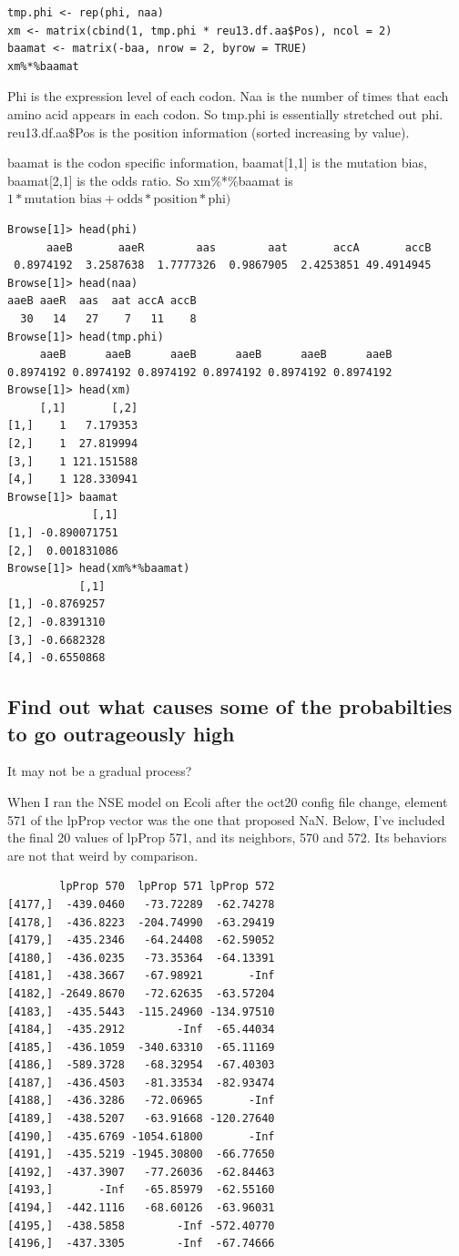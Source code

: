 \begin{verbatim}
tmp.phi <- rep(phi, naa)
xm <- matrix(cbind(1, tmp.phi * reu13.df.aa$Pos), ncol = 2)
baamat <- matrix(-baa, nrow = 2, byrow = TRUE)
xm%*%baamat
\end{verbatim}

Phi is the expression level of each codon. Naa is the number of times that each amino acid appears in each codon. So tmp.phi is essentially stretched out phi. reu13.df.aa\$Pos is the position information (sorted increasing by value). 

baamat is the codon specific information, baamat[1,1] is the mutation bias, baamat[2,1] is the odds ratio. So xm\%*\%baamat is $1*\mbox{mutation bias}+\mbox{odds}*\mbox{position}*\mbox{phi})$

\begin{verbatim}
Browse[1]> head(phi)
      aaeB       aaeR        aas        aat       accA       accB 
 0.8974192  3.2587638  1.7777326  0.9867905  2.4253851 49.4914945 
Browse[1]> head(naa)
aaeB aaeR  aas  aat accA accB 
  30   14   27    7   11    8 
Browse[1]> head(tmp.phi)
     aaeB      aaeB      aaeB      aaeB      aaeB      aaeB 
0.8974192 0.8974192 0.8974192 0.8974192 0.8974192 0.8974192 
Browse[1]> head(xm)
     [,1]       [,2]
[1,]    1   7.179353
[2,]    1  27.819994
[3,]    1 121.151588
[4,]    1 128.330941
Browse[1]> baamat
             [,1]
[1,] -0.890071751
[2,]  0.001831086
Browse[1]> head(xm%*%baamat)
           [,1]
[1,] -0.8769257
[2,] -0.8391310
[3,] -0.6682328
[4,] -0.6550868
\end{verbatim}



\subsection{Find out what causes some of the probabilties to go outrageously high}

It may not be a gradual process?

When I ran the NSE model on Ecoli after the oct20 config file change, element 571 of the lpProp vector was the one that proposed NaN. Below, I've included the final 20 values of lpProp 571, and its neighbors, 570 and 572. Its behaviors are not that weird by comparison.

\begin{verbatim}
      	lpProp 570  lpProp 571 lpProp 572
[4177,]  -439.0460   -73.72289  -62.74278
[4178,]  -436.8223  -204.74990  -63.29419
[4179,]  -435.2346   -64.24408  -62.59052
[4180,]  -436.0235   -73.35364  -64.13391
[4181,]  -438.3667   -67.98921       -Inf
[4182,] -2649.8670   -72.62635  -63.57204
[4183,]  -435.5443  -115.24960 -134.97510
[4184,]  -435.2912        -Inf  -65.44034
[4185,]  -436.1059  -340.63310  -65.11169
[4186,]  -589.3728   -68.32954  -67.40303
[4187,]  -436.4503   -81.33534  -82.93474
[4188,]  -436.3286   -72.06965       -Inf
[4189,]  -438.5207   -63.91668 -120.27640
[4190,]  -435.6769 -1054.61800       -Inf
[4191,]  -435.5219 -1945.30800  -66.77650
[4192,]  -437.3907   -77.26036  -62.84463
[4193,]       -Inf   -65.85979  -62.55160
[4194,]  -442.1116   -68.60126  -63.96031
[4195,]  -438.5858        -Inf -572.40770
[4196,]  -437.3305        -Inf  -67.74666
\end{verbatim}

